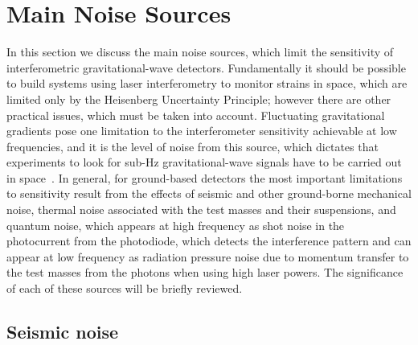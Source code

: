 \documentclass{article}
\begin{document}

\newpage

\section{Main Noise Sources}
\label{section:noise}

In this section we discuss the main noise sources, which limit the sensitivity of
interferometric gravitational-wave detectors. Fundamentally it should be
possible to build systems using laser interferometry to monitor strains in space,
which are limited only by the Heisenberg Uncertainty Principle; however there
are other practical issues, which must be taken into account. Fluctuating
gravitational gradients pose one limitation to the interferometer sensitivity
achievable at low frequencies, and it is the level of noise from this source,
which dictates that experiments to look for sub-Hz gravitational-wave signals
have to be carried out in space~\cite{Spero, Saulson1, Beccaria, Thorne:1998}.
In general, for ground-based detectors the most important limitations to
sensitivity result from the effects of seismic and other ground-borne mechanical
noise, thermal noise associated with the test masses and their suspensions, and
quantum noise, which appears at high frequency as shot noise in the photocurrent
from the photodiode, which detects the interference pattern and can appear at low
frequency as radiation pressure noise due to momentum transfer to the test
masses from the photons when using high laser powers. The significance of each
of these sources will be briefly reviewed.


\subsection{Seismic noise}
\label{subsection:seismic}
\end{document}
